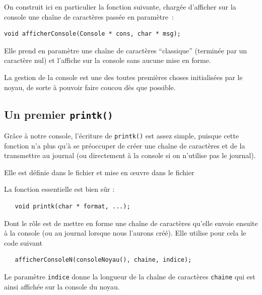    On construit ici en particulier la fonction suivante, chargée
d'afficher sur la console une chaîne de caractères passée en paramètre~:

\begin{lstlisting}
void afficherConsole(Console * cons, char * msg);
\end{lstlisting}

   Elle prend en paramètre une chaîne de caractères ``classique''
(terminée par un caractère nul) et l'affiche sur la console sans aucune
mise en forme.

   La gestion de la console est une des toutes premières choses
initialisées par le noyau, de sorte à pouvoir faire coucou dès que
possible.

%
\subsection{Un premier {\tt printk()}}

   Grâce à notre console, l'écriture de {\tt printk()} est assez
simple, puisque cette fonction n'a plus qu'à se préoccuper de créer
une chaîne de caractères et de la transmettre au journal (ou
directement à la console si on n'utilise pas le journal).

   Elle est définie dans le fichier 
   et mise en \oe{}uvre dans le fichier

   La fonction essentielle est bien sûr :

\begin{lstlisting}
   void printk(char * format, ...);
\end{lstlisting} 

   Dont le rôle est de mettre en forme une chaîne de caractères
qu'elle envoie ensuite à la console (ou au journal lorsque nous
l'aurons créé). Elle utilise pour cela le code suivant

\begin{lstlisting}
   afficherConsoleN(consoleNoyau(), chaine, indice);  
\end{lstlisting}

   Le paramètre \lstinline!indice! donne la longueur de la chaîne de
caractères \lstinline!chaine! qui est ainsi affichée sur la console du
noyau.
   
%
